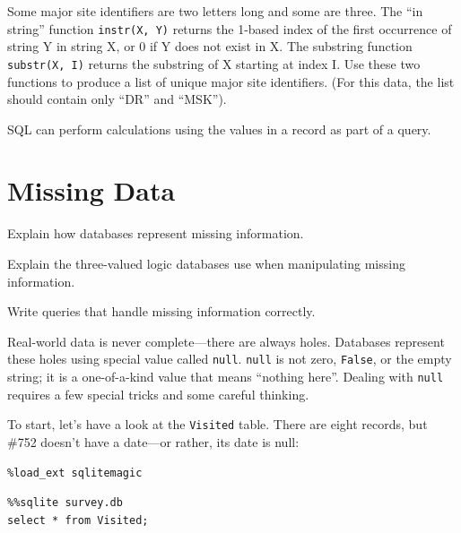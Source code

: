 \documentclass{book}
\begin{document}
Some major site identifiers are two letters long and some are three. The
``in string'' function \texttt{instr(X, Y)} returns the 1-based index of
the first occurrence of string Y in string X, or 0 if Y does not exist
in X. The substring function \texttt{substr(X, I)} returns the substring
of X starting at index I. Use these two functions to produce a list of
unique major site identifiers. (For this data, the list should contain
only ``DR'' and ``MSK'').

\begin{keypoints}
\begin{swcitemize}
\item
  SQL can perform calculations using the values in a record as part of a
  query.
\end{swcitemize}
\end{keypoints}

\section{Missing Data}

\begin{objectives}
\begin{swcitemize}
\item
  Explain how databases represent missing information.
\item
  Explain the three-valued logic databases use when manipulating missing
  information.
\item
  Write queries that handle missing information correctly.
\end{swcitemize}
\end{objectives}

Real-world data is never complete---there are always holes. Databases
represent these holes using special value called \texttt{null}.
\texttt{null} is not zero, \texttt{False}, or the empty string; it is a
one-of-a-kind value that means ``nothing here''. Dealing with
\texttt{null} requires a few special tricks and some careful thinking.

To start, let's have a look at the \texttt{Visited} table. There are
eight records, but \#752 doesn't have a date---or rather, its date is
null:

\begin{verbatim}
%load_ext sqlitemagic
\end{verbatim}

\begin{verbatim}
%%sqlite survey.db
select * from Visited;
\end{verbatim}
\end{document}
